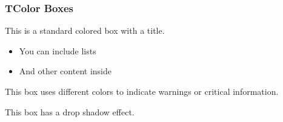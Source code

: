 \documentclass[aspectratio=169,professionalfonts]{beamer}
\begin{document}
\begin{frame}
    \frametitle{TColor Boxes}
    
    \begin{tcolorbox}[
        colback=ugmLightGrey,
        colframe=ugmBlue,
        title=Standard Box,
        fonttitle=\bfseries
    ]
        This is a standard colored box with a title.
        
        \begin{itemize}
            \item You can include lists
            \item And other content inside
        \end{itemize}
    \end{tcolorbox}
    
    \begin{tcolorbox}[
        colback=red!5,
        colframe=red!80!black,
        title=Warning Box,
        fonttitle=\bfseries
    ]
        This box uses different colors to indicate warnings or critical information.
    \end{tcolorbox}
    
    \begin{tcolorbox}[
        enhanced,
        colback=ugmLightGrey,
        colframe=ugmBlue,
        title=Box with Shadow,
        fonttitle=\bfseries,
        drop shadow
    ]
        This box has a drop shadow effect.
    \end{tcolorbox}
\end{frame}
\end{document}
